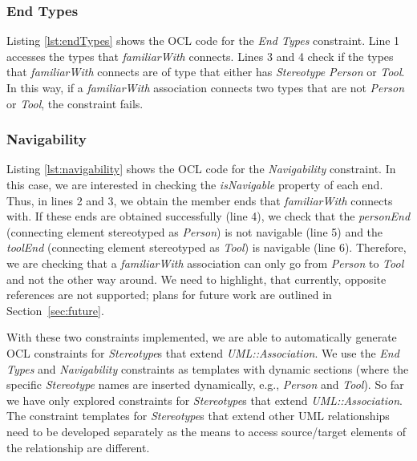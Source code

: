 \subsubsection{End Types}
Listing \ref{lst:endTypes} shows the OCL code for the \emph{End Types} constraint. 
Line 1 accesses the types that \emph{familiarWith} connects. 
Lines 3 and 4 check if the types that \emph{familiarWith} connects are of type that either has \textit{Stereotype} \emph{Person} or \emph{Tool}. 
In this way, if a \emph{familiarWith} association connects two types that are not \emph{Person} or \emph{Tool}, the constraint fails.



\subsubsection{Navigability}
Listing \ref{lst:navigability} shows the OCL code for the \emph{Navigability} constraint. 
In this case, we are interested in checking the \emph{isNavigable} property of each end. 
Thus, in lines 2 and 3, we obtain the member ends that \emph{familiarWith} connects with. 
If these ends are obtained successfully (line 4), we check that the \emph{personEnd} (connecting element stereotyped as \emph{Person}) is not navigable (line 5) and the \emph{toolEnd} (connecting element stereotyped as \emph{Tool}) is navigable (line 6). 
Therefore, we are checking that a \emph{familiarWith} association can only go from \emph{Person} to \emph{Tool} and not the other way around. 
We need to highlight, that currently, opposite references are not supported; plans for future work are outlined in Section~\ref{sec:future}.

\begin{figure}[h]
	
\end{figure}

With these two constraints implemented, we are able to automatically generate OCL constraints for \textit{Stereotype}s that extend \emph{UML::Association}. 
We use the \emph{End Types} and \emph{Navigability} constraints as templates with dynamic sections (where the specific \textit{Stereotype} names are inserted dynamically, e.g., \emph{Person} and \emph{Tool}). 
So far we have only explored constraints for \textit{Stereotype}s that extend \emph{UML::Association}. 
The constraint templates for \textit{Stereotype}s that extend other UML relationships need to be developed separately as the means to access source/target elements of the relationship are different.


